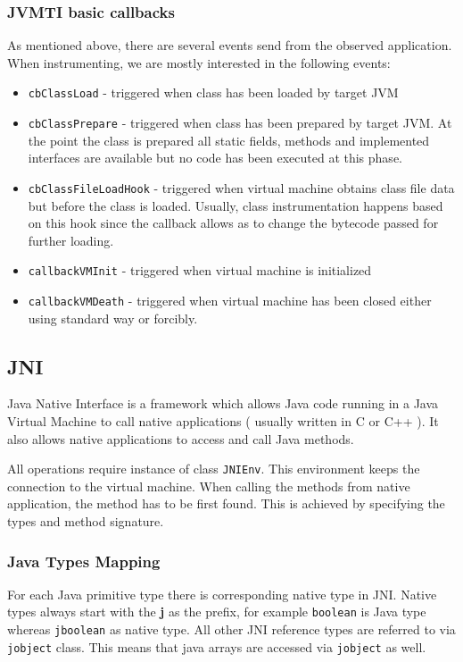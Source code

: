 \subsubsection{JVMTI basic callbacks}
As mentioned above, there are several events send from the observed application. When instrumenting, we are mostly interested in the following events:
\begin{itemize}
	\item  \texttt{cbClassLoad} - triggered when class has been loaded by target JVM
	\item \texttt{cbClassPrepare} - triggered when class has been prepared by target JVM. At the point the class is prepared all static fields, methods and implemented interfaces are available but no code has been executed at this phase.
	\item \texttt{cbClassFileLoadHook} - triggered when virtual machine obtains class file data but before the class is loaded. Usually, class instrumentation happens based on this hook since the callback allows as to change the bytecode passed for further loading.
	\item  \texttt{callbackVMInit} - triggered when virtual machine is initialized
	\item  \texttt{callbackVMDeath} - triggered when virtual machine has been closed either using standard way or forcibly.
\end{itemize}

\subsection{JNI}
Java Native Interface is a framework which allows Java code running in a Java Virtual Machine to call native applications ( usually written in C or C++ ). It also allows native applications to access and call Java methods.

All operations require instance of class \texttt{JNIEnv}. This environment keeps the connection to the virtual machine. When calling the methods from native application, the method has to be first found. This is achieved by specifying  the types and method signature.
\subsubsection{Java Types Mapping}
For each Java primitive type there is corresponding native type in JNI. Native types always start with the \textbf{j} as the prefix, for example \texttt{boolean} is Java type whereas \texttt{jboolean} as native type.
All other JNI reference types are referred to via \texttt{jobject} class. This means that java arrays are accessed via \texttt{jobject} as well.

